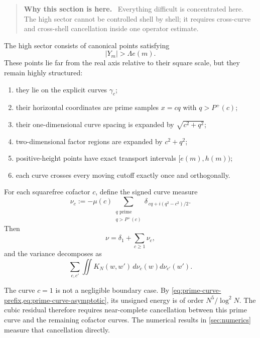 \documentclass[11pt]{article}
\theoremstyle{definition}
\theoremstyle{remark}
\newcommand{\Pplus}{P^{+}}
\newcommand{\1}{\mathbf{1}}
\newenvironment{motivation}
  {\begin{quote}\small\color{ovvogray}\textbf{Why this section is here.}\ }
  {\end{quote}}
\begin{document}
\begin{motivation}
Everything difficult is concentrated here.  The high sector cannot be controlled shell by shell; it requires cross-curve and cross-shell cancellation inside one operator estimate.
\end{motivation}

The high sector consists of canonical points satisfying
\begin{equation}
 |Y_m|>\Lambda e(m).
 \label{eq:high-sector}
\end{equation}
These points lie far from the real axis relative to their square scale,
but they remain highly structured:

\begin{enumerate}[leftmargin=1.7em,itemsep=0.3em]
\item they lie on the explicit curves $\gamma_c$;
\item their horizontal coordinates are prime samples $x=cq$ with
      $q>\Pplus(c)$;
\item their one-dimensional curve spacing is expanded by
      $\sqrt{c^2+q^2}$;
\item two-dimensional factor regions are expanded by
      $c^2+q^2$;
\item positive-height points have exact transport intervals
      $[e(m),h(m))$;
\item each curve crosses every moving cutoff exactly once and
      orthogonally.
\end{enumerate}

For each squarefree cofactor $c$, define the signed curve measure
\begin{equation}
 \nu_c
 :=
 -\mu(c)
 \sum_{\substack{q\text{ prime}\\q>\Pplus(c)}}
 \delta_{\,cq+i(q^2-c^2)/2}.
 \label{eq:nu-c}
\end{equation}
Then
\begin{equation}
 \nu=\delta_1+\sum_{c\ge1}\nu_c,
 \label{eq:nu-curve-sum}
\end{equation}
and the variance decomposes as
\begin{equation}
 \sum_{c,c'}
 \iint K_N(w,w')\,d\nu_c(w)d\nu_{c'}(w').
 \label{eq:curve-interactions}
\end{equation}

The curve $c=1$ is not a negligible boundary case.  By
\cref{eq:prime-curve-prefix,eq:prime-curve-asymptotic}, its unsigned
energy is of order $N^5/\log^2N$.  The cubic residual therefore requires
near-complete cancellation between this prime curve and the remaining
cofactor curves.  The numerical results in \cref{sec:numerics} measure
that cancellation directly.
\end{document}
